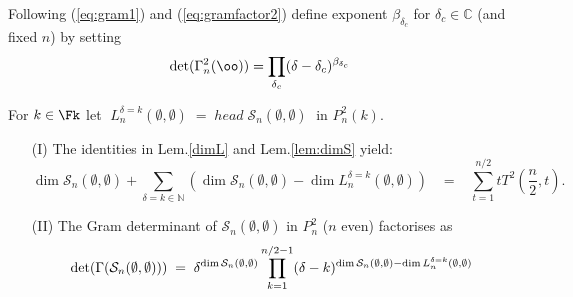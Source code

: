 \documentclass[reqno,10pt,a4paper]{amsart}
\newcommand{\C}{\mathbb{C}}
\newcommand{\N}{\mathbb{N}}
\newcommand{\beq}{\begin{equation}}
\newcommand{\eq}{\end{equation}}
\newcommand{\red}[1]{\textcolor{red}{#1}}
\newcommand{\ppm}[1]{\red{#1}}
\newcommand{\kn}{k}
\newcommand{\nk}{n}  %
\newcommand{\cell}{\mathcal{S}}
\newcommand{\T}{T^2}  %
\newcommand{\Gram}{\Gamma}
\begin{document}

Following (\ref{eq:gram1}) 
and (\ref{eq:gramfactor2})
define 
exponent 
$\beta_{\delta_c}$ for $\delta_c \in \C$ 
(and fixed $n$)
by setting
\beq  \label{eq:gram21} 
\det(\Gram^2_n(\oo)) = \prod_{\delta_c} (\delta-\delta_c)^{\beta_{\delta_c}} 
\eq 

\begin{lem}\label{gramfact}
For $k \in \Fk$
let 
$ \; L_\nk^{\delta=\kn}(\emptyset,\emptyset)
\; = \; 
head \;\cell_\nk(\emptyset,\emptyset) \;$
{in $P^2_\nk(\kn)$}. 
\begin{enumerate}
 \item[(I)] The identities in Lem.\ref{dimL} and Lem.\ref{lem:dimS} yield:
$$
\dim \cell_\nk(\emptyset,\emptyset)  + 
\sum_{\delta=\kn \in \N} 
\left( \dim \cell_\nk(\emptyset,\emptyset) 
- \dim
L_\nk^{\delta=\kn}(\emptyset,\emptyset)\right) 
\;\;\;  =  \;\;\;    {\sum_{t=1}^{\nk/2}}t \T(\frac{\nk}{2}, t).
$$
\item[(II)]
The Gram determinant of $\cell_\nk(\emptyset,\emptyset)$ 
{in $P^2_\nk$} ($n$ even)
factorises as 
\beq \label{eq:detfact2}
\det
(\Gram(\cell_\nk(\emptyset,\emptyset) ))
\; = \; 
\delta^{\dim \cell_\nk(\emptyset,\emptyset)}
\prod_{k=1}^{\nk/2-1}
(\delta-\kn)^{
\dim \cell_\nk(\emptyset,\emptyset) - \dim L_\nk^{\delta=\kn}(\emptyset,\emptyset)
}
\eq 
\end{enumerate}
\end{lem}
\end{document}
